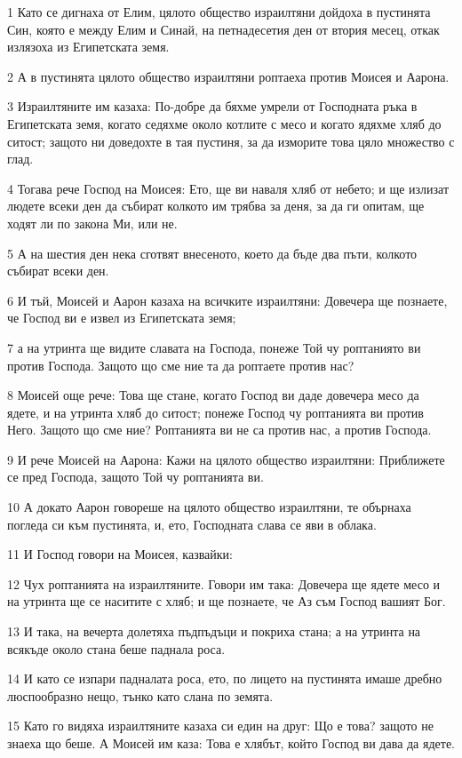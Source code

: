 \par 1 Като се дигнаха от Елим, цялото общество израилтяни дойдоха в пустинята Син, която е между Елим и Синай, на петнадесетия ден от втория месец, откак излязоха из Египетската земя.
\par 2 А в пустинята цялото общество израилтяни роптаеха против Моисея и Аарона.
\par 3 Израилтяните им казаха: По-добре да бяхме умрели от Господната ръка в Египетската земя, когато седяхме около котлите с месо и когато ядяхме хляб до ситост; защото ни доведохте в тая пустиня, за да изморите това цяло множество с глад.
\par 4 Тогава рече Господ на Моисея: Ето, ще ви наваля хляб от небето; и ще излизат людете всеки ден да събират колкото им трябва за деня, за да ги опитам, ще ходят ли по закона Ми, или не.
\par 5 А на шестия ден нека сготвят внесеното, което да бъде два пъти, колкото събират всеки ден.
\par 6 И тъй, Моисей и Аарон казаха на всичките израилтяни: Довечера ще познаете, че Господ ви е извел из Египетската земя;
\par 7 а на утринта ще видите славата на Господа, понеже Той чу роптаниято ви против Господа. Защото що сме ние та да роптаете против нас?
\par 8 Моисей още рече: Това ще стане, когато Господ ви даде довечера месо да ядете, и на утринта хляб до ситост; понеже Господ чу роптанията ви против Него. Защото що сме ние? Роптанията ви не са против нас, а против Господа.
\par 9 И рече Моисей на Аарона: Кажи на цялото общество израилтяни: Приближете се пред Господа, защото Той чу роптанията ви.
\par 10 А докато Аарон говореше на цялото общество израилтяни, те обърнаха погледа си към пустинята, и, ето, Господната слава се яви в облака.
\par 11 И Господ говори на Моисея, казвайки:
\par 12 Чух роптанията на израилтяните. Говори им така: Довечера ще ядете месо и на утринта ще се наситите с хляб; и ще познаете, че Аз съм Господ вашият Бог.
\par 13 И така, на вечерта долетяха пъдпъдъци и покриха стана; а на утринта на всякъде около стана беше паднала роса.
\par 14 И като се изпари падналата роса, ето, по лицето на пустинята имаше дребно люспообразно нещо, тънко като слана по земята.
\par 15 Като го видяха израилтяните казаха си един на друг: Що е това? защото не знаеха що беше. А Моисей им каза: Това е хлябът, който Господ ви дава да ядете.

